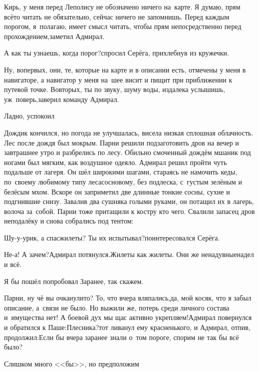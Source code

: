 \diagdash Кирь, у меня перед Леполису не обозначено ничего на~карте. Я думаю, прям всё\sdash то читать не обязательно, сейчас ничего не запомнишь. Перед каждым порогом, я~полагаю, имеет смысл читать, чтобы прям непосредственно перед прохождением,\mdash заметил Адмирал.

\diagdash А как ты узнаешь, когда порог?\mdash спросил Серёга, прихлебнув из кружечки.

\diagdash Ну, во\sdash первых, они, те, которые на карте и в описании есть, отмечены у меня в навигаторе, а навигатор у меня на~шее висит и пищит при приближении к путевой точке. Во\sdash вторых, ты по звуку, шуму воды, издалека услышишь, уж~поверь,\mdash заверил команду Адмирал.

\diagdash Ладно, успокоил\myldots{}

\vspace{0.5cm}
\myldots{}Дождик кончился, но погода не улучшалась, висела низкая сплошная облачность. Лес после дождя был мокрым. Парни решили подзаготовить дров на вечер и завтрашнее утро и разбрелись по лесу. Обильно смоченный дождём мшаник под ногами был мягким, как воздушное одеяло. Адмирал решил пройти чуть подальше от лагеря. Он шёл широкими шагами, стараясь не намочить кеды, по~своему любимому типу леса\mdash сосновому, без подлеска, с~густым зелёным и белёсым мхом. Вскоре он заприметил две длинные тонкие сосны, сухие и подгнившие снизу. Завалив два сушняка голыми руками, он потащил их в лагерь, волоча за~собой. Парни тоже притащили к костру кто чего. Свалили запасец дров неподалёку и снова собрались под тентом:

\diagdash Шу-у-урик, а спасжилеты? Ты их испытывал?\mdash поинтересовался Серёга.

\diagdash Не-а! А зачем?\mdash Адмирал потянулся.\mdash Жилеты как жилеты. Они же ненадувные\mdash надел и всё.

\diagdash Я бы пошёл попробовал\myldots{} Заранее, так скажем.

\diagdash Парни, ну чё вы очканули\sdash то? То, что вчера вляпались,\mdash да, мой косяк, что я забыл описание, а~связи не было. Но выжили же, потерь среди личного состава и~имущества нет! А боевой дух мы щас активно укрепляем!\mdash Адмирал повернулся и обратился к Паше:\mdash Плесни\sdash ка?\mdash тот ливанул ему красненького, и Адмирал, отпив, продолжил:\mdash Если бы вчера заранее знали о~том пороге, спорим не так бы всё было?

\diagdash Слишком много <<бы>>, но предположим\myldots{}

